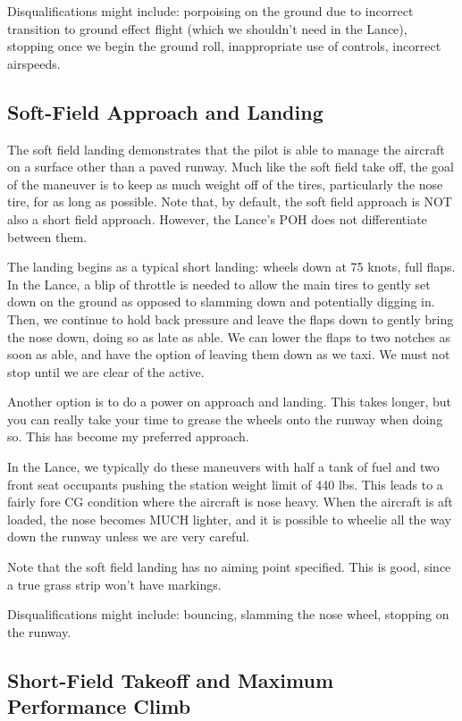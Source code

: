 Disqualifications might include: porpoising on the ground due to incorrect transition to ground effect flight (which we shouldn't need in the Lance), stopping once we begin the ground roll, inappropriate use of controls, incorrect airspeeds.

\subsection{Soft-Field Approach and Landing}

The soft field landing demonstrates that the pilot is able to manage the aircraft on a surface other than a paved runway. Much like the soft field take off, the goal of the maneuver is to keep as much weight off of the tires, particularly the nose tire, for as long as possible. Note that, by default, the soft field approach is NOT also a short field approach. However, the Lance's POH does not differentiate between them.

The landing begins as a typical short landing: wheels down at 75 knots, full flaps. In the Lance, a blip of throttle is needed to allow the main tires to gently set down on the ground as opposed to slamming down and potentially digging in. Then, we continue to hold back pressure and leave the flaps down to gently bring the nose down, doing so as late as able. We can lower the flaps to two notches as soon as able, and have the option of leaving them down as we taxi. We must not stop until we are clear of the active.

Another option is to do a power on approach and landing. This takes longer, but you can really take your time to grease the wheels onto the runway when doing so. This has become my preferred approach.

In the Lance, we typically do these maneuvers with half a tank of fuel and two front seat occupants pushing the station weight limit of 440 lbs. This leads to a fairly fore CG condition where the aircraft is nose heavy. When the aircraft is aft loaded, the nose becomes MUCH lighter, and it is possible to wheelie all the way down the runway unless we are very careful.

Note that the soft field landing has no aiming point specified. This is good, since a true grass strip won't have markings.

Disqualifications might include: bouncing, slamming the nose wheel, stopping on the runway.

\subsection{Short-Field Takeoff and Maximum Performance Climb}

